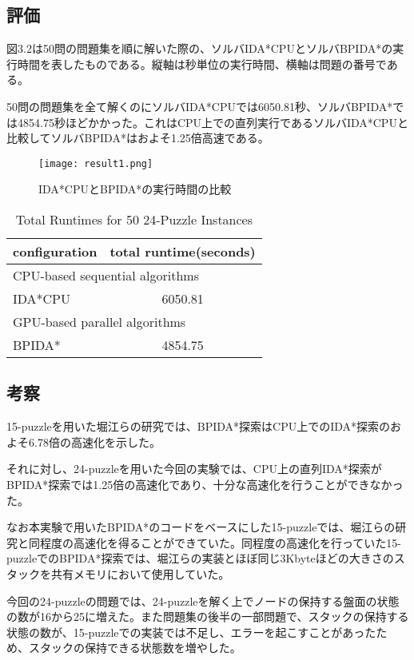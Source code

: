 \documentclass[a4paper,11pt,oneside,openany]{jsbook}
\begin{document}
\subsection{評価}
図3.2は50問の問題集を順に解いた際の、ソルバIDA*CPUとソルバBPIDA*の実行時間を表したものである。縦軸は秒単位の実行時間、横軸は問題の番号である。

50問の問題集を全て解くのにソルバIDA*CPUでは6050.81秒、ソルバBPIDA*では4854.75秒ほどかかった。これはCPU上での直列実行であるソルバIDA*CPUと比較してソルバBPIDA*はおよそ1.25倍高速である。


\begin{figure}[H]
\begin{center}
\texttt{[image: result1.png]}
\caption{IDA*CPUとBPIDA*の実行時間の比較}
\end{center}
\end{figure}

\begin{table}[H]
\centering
\caption{Total Runtimes for 50 24-Puzzle Instances}
\label{my-label}
\begin{tabular}{|l|c|}
\hline
configuration & \multicolumn{1}{l|}{total runtime(seconds)} \\ \hline
\multicolumn{2}{|l|}{CPU-based sequential algorithms} \\ \hline
IDA*CPU & 6050.81 \\ \hline
\multicolumn{2}{|l|}{GPU-based parallel algorithms} \\ \hline
BPIDA* & 4854.75 \\ \hline
\end{tabular}
\end{table}


\subsection{考察}
15-puzzleを用いた堀江らの研究\cite{HA17}では、BPIDA*探索はCPU上でのIDA*探索のおよそ6.78倍の高速化を示した。

それに対し、24-puzzleを用いた今回の実験では、CPU上の直列IDA*探索がBPIDA*探索では1.25倍の高速化であり、十分な高速化を行うことができなかった。

なお本実験で用いたBPIDA*のコードをベースにした15-puzzleでは、堀江らの研究と同程度の高速化を得ることができていた。同程度の高速化を行っていた15-puzzleでのBPIDA*探索では、堀江らの実装とほぼ同じ3Kbyteほどの大きさのスタックを共有メモリにおいて使用していた。

今回の24-puzzleの問題では、24-puzzleを解く上でノードの保持する盤面の状態の数が16から25に増えた。また問題集の後半の一部問題で、スタックの保持する状態の数が、15-puzzleでの実装では不足し、エラーを起こすことがあったため、スタックの保持できる状態数を増やした。
\end{document}
